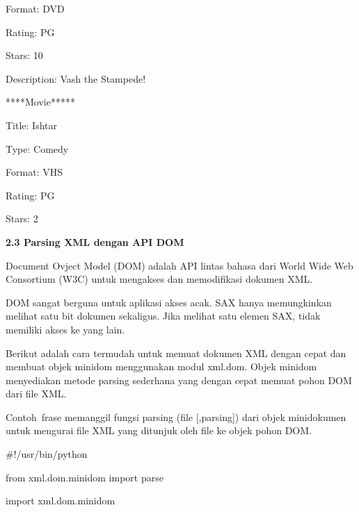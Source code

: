 \noindent 
{\fontsize{10pt}{10pt}\selectfont Format: DVD} \par
\noindent 
{\fontsize{10pt}{10pt}\selectfont Rating: PG} \par
\noindent 
{\fontsize{10pt}{10pt}\selectfont Stars: 10} \par
\noindent 
{\fontsize{10pt}{10pt}\selectfont Description: Vash the Stampede!} \par
\noindent 
{\fontsize{10pt}{10pt}\selectfont *****Movie*****} \par
\noindent 
{\fontsize{10pt}{10pt}\selectfont Title: Ishtar} \par
\noindent 
{\fontsize{10pt}{10pt}\selectfont Type: Comedy} \par
\noindent 
{\fontsize{10pt}{10pt}\selectfont Format: VHS} \par
\noindent 
{\fontsize{10pt}{10pt}\selectfont Rating: PG} \par
\noindent 
{\fontsize{10pt}{10pt}\selectfont Stars: 2} \par
\noindent 
\vspace{10pt}
\noindent 
\textbf{2.3 Parsing XML dengan API DOM} \par
\noindent 
 \hspace*{0.5in} Document Ovject Model (DOM) adalah API lintas bahasa dari World Wide Web Consortium (W3C) untuk mengakses dan memodifikasi dokumen XML. \par
\noindent 
 \hspace*{0.5in} DOM sangat berguna untuk aplikasi akses acak. SAX hanya memungkinkan melihat satu bit dokumen sekaligus. Jika melihat satu elemen SAX, tidak memiliki akses ke yang lain. \par
\noindent 
 \hspace*{0.5in} Berikut adalah cara termudah untuk memuat dokumen XML dengan cepat dan membuat objek minidom menggunakan modul xml.dom. Objek minidom menyediakan metode parsing sederhana yang dengan cepat memuat pohon DOM dari file XML. \par
\noindent 
 \hspace*{0.5in} Contoh~frase memanggil fungsi  parsing (file [,parsing]) dari objek minidokumen untuk mengurai file XML yang ditunjuk oleh file ke objek pohon DOM. \par
\noindent 
 $  \#  $!/usr/bin/python \par
\vspace{12pt}
\noindent 
from xml.dom.minidom import parse \par
\noindent 
import xml.dom.minidom \par

